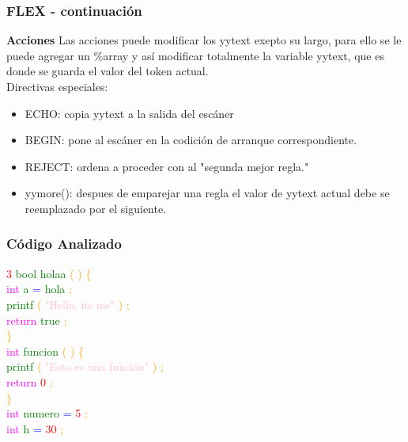 \documentclass{beamer}
\begin{document}
\begin{frame}
\frametitle{FLEX - continuaci\'on} 
\textbf{Acciones} \newline 
Las acciones puede modificar los yytext exepto su largo, para ello se le puede agregar un \%array y as\'i modificar totalmente la variable yytext, que es donde se guarda el valor del token actual.\\Directivas especiales:\begin{itemize} \item ECHO: copia yytext a la salida del esc\'aner  \item BEGIN: pone al esc\'aner en la codici\'on de arranque correspondiente. \item REJECT: ordena a proceder con al "segunda mejor regla." \item yymore(): despues de emparejar una regla el valor de yytext actual debe se reemplazado por el siguiente.\end{itemize}\end{frame}
\begin{frame}
\frametitle{C\'odigo Analizado}
\textcolor{red}{3} \textcolor{green}{bool} \textcolor{green}{holaa} \textcolor{orange}{(} \textcolor{orange}{)} \textcolor{orange}{\{} \\ 
 \textcolor{magenta}{int} \textcolor{green}{a} \textcolor{blue}{=} \textcolor{green}{hola} \textcolor{orange}{;} \\ 
 \textcolor{green}{printf} \textcolor{orange}{(} \textcolor{pink}{"Hello, its me"} \textcolor{orange}{)} \textcolor{orange}{;} \\ 
 \textcolor{magenta}{return} \textcolor{green}{true} \textcolor{orange}{;} \\ 
 \textcolor{orange}{\}} \\ 
 \textcolor{magenta}{int} \textcolor{green}{funcion} \textcolor{orange}{(} \textcolor{orange}{)} \textcolor{orange}{\{} \\ 
 \textcolor{green}{printf} \textcolor{orange}{(} \textcolor{pink}{"Esto es una función"} \textcolor{orange}{)} \textcolor{orange}{;} \\ 
 \textcolor{magenta}{return} \textcolor{red}{0} \textcolor{orange}{;} \\ 
 \textcolor{orange}{\}} \\ 
 \textcolor{magenta}{int} \textcolor{green}{numero} \textcolor{blue}{=} \textcolor{red}{5} \textcolor{orange}{;} \\ 
 \textcolor{magenta}{int} \textcolor{green}{h} \textcolor{blue}{=} \textcolor{red}{30} \textcolor{orange}{;} \\ 
 \textcolor{white}{} \end{frame}
\end{document}

